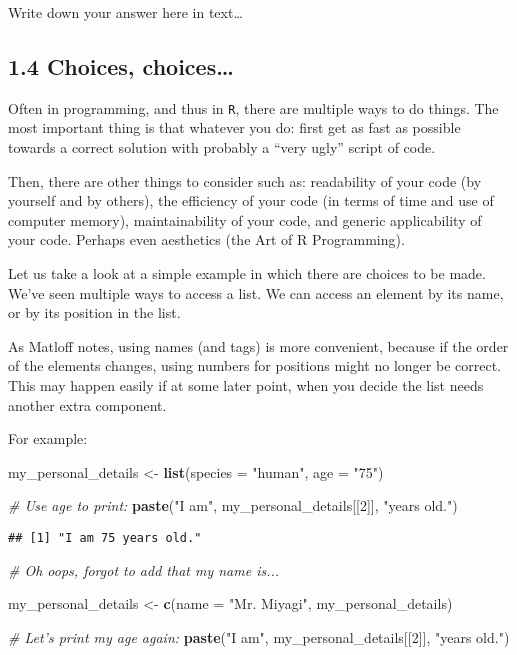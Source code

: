 \documentclass[]{article}
\newenvironment{Shaded}{\begin{snugshade}}{\end{snugshade}}
\newcommand{\CommentTok}[1]{\textcolor[rgb]{0.56,0.35,0.01}{\textit{#1}}}
\newcommand{\DataTypeTok}[1]{\textcolor[rgb]{0.13,0.29,0.53}{#1}}
\newcommand{\DecValTok}[1]{\textcolor[rgb]{0.00,0.00,0.81}{#1}}
\newcommand{\KeywordTok}[1]{\textcolor[rgb]{0.13,0.29,0.53}{\textbf{#1}}}
\newcommand{\NormalTok}[1]{#1}
\newcommand{\StringTok}[1]{\textcolor[rgb]{0.31,0.60,0.02}{#1}}
\begin{document}
Write down your answer here in text\ldots{}

\hypertarget{choices-choices}{%
\subsection{1.4 Choices, choices\ldots{}}\label{choices-choices}}

Often in programming, and thus in \texttt{R}, there are multiple ways to
do things. The most important thing is that whatever you do: first get
as fast as possible towards a correct solution with probably a ``very
ugly'' script of code.

Then, there are other things to consider such as: readability of your
code (by yourself and by others), the efficiency of your code (in terms
of time and use of computer memory), maintainability of your code, and
generic applicability of your code. Perhaps even aesthetics (the Art of
R Programming).

Let us take a look at a simple example in which there are choices to be
made. We've seen multiple ways to access a list. We can access an
element by its name, or by its position in the list.

As Matloff notes, using names (and tags) is more convenient, because if
the order of the elements changes, using numbers for positions might no
longer be correct. This may happen easily if at some later point, when
you decide the list needs another extra component.

For example:

\begin{Shaded}
\begin{Highlighting}[]
\NormalTok{my_personal_details <-}\StringTok{ }\KeywordTok{list}\NormalTok{(}\DataTypeTok{species =} \StringTok{"human"}\NormalTok{, }\DataTypeTok{age =} \StringTok{"75"}\NormalTok{)}

\CommentTok{# Use age to print:}
\KeywordTok{paste}\NormalTok{(}\StringTok{"I am"}\NormalTok{, my_personal_details[[}\DecValTok{2}\NormalTok{]], }\StringTok{"years old."}\NormalTok{)}
\end{Highlighting}
\end{Shaded}

\begin{verbatim}
## [1] "I am 75 years old."
\end{verbatim}

\begin{Shaded}
\begin{Highlighting}[]
\CommentTok{# Oh oops, forgot to add that my name is...}

\NormalTok{my_personal_details <-}\StringTok{ }\KeywordTok{c}\NormalTok{(}\DataTypeTok{name =} \StringTok{"Mr. Miyagi"}\NormalTok{, my_personal_details)}

\CommentTok{# Let's print my age again:}
\KeywordTok{paste}\NormalTok{(}\StringTok{"I am"}\NormalTok{, my_personal_details[[}\DecValTok{2}\NormalTok{]], }\StringTok{"years old."}\NormalTok{)}
\end{Highlighting}
\end{Shaded}
\end{document}
